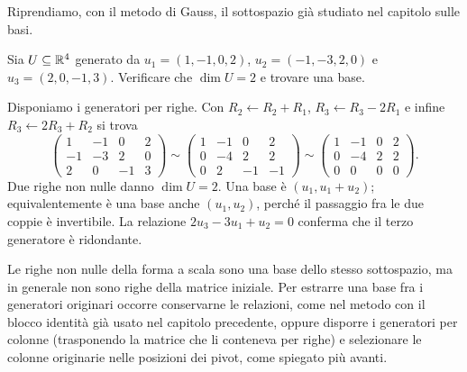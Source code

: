 Riprendiamo, con il metodo di Gauss, il sottospazio già studiato nel capitolo sulle basi.
\begin{esercizio}
Sia $U\subseteq\mathbb{R}^4$ generato da $u_1=(1,-1,0,2)$, $u_2=(-1,-3,2,0)$ e $u_3=(2,0,-1,3)$. Verificare che $\dim U=2$ e trovare una base.
\end{esercizio}
\begin{svolgimento}
Disponiamo i generatori per righe. Con $R_2\leftarrow R_2+R_1$, $R_3\leftarrow R_3-2R_1$ e infine $R_3\leftarrow2R_3+R_2$ si trova
\[
 \begin{pmatrix}1&-1&0&2\\-1&-3&2&0\\2&0&-1&3\end{pmatrix}
 \sim\begin{pmatrix}1&-1&0&2\\0&-4&2&2\\0&2&-1&-1\end{pmatrix}
 \sim\begin{pmatrix}1&-1&0&2\\0&-4&2&2\\0&0&0&0\end{pmatrix}.
\]
Due righe non nulle danno $\dim U=2$. Una base è $(u_1,u_1+u_2)$; equivalentemente è una base anche $(u_1,u_2)$, perché il passaggio fra le due coppie è invertibile. La relazione $2u_3-3u_1+u_2=0$ conferma che il terzo generatore è ridondante.
\end{svolgimento}
\begin{osservazione}
Le righe non nulle della forma a scala sono una base dello stesso sottospazio, ma in generale non sono righe della matrice iniziale. Per estrarre una base fra i generatori originari occorre conservarne le relazioni, come nel metodo con il blocco identità già usato nel capitolo precedente, oppure disporre i generatori per colonne (trasponendo la matrice che li conteneva per righe) e selezionare le colonne originarie nelle posizioni dei pivot, come spiegato più avanti.
\end{osservazione}
